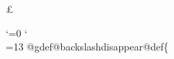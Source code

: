 {{  \lbracechar
  \leq
  \mathopsup
  \minus
  \ogonek
  \pounds
  \point
  \print
  \quotedblbase
  \quotedblleft
  \quotedblright
  \quoteleft
  \quoteright
  \quotesinglbase
  \rbracechar
  \result
  \sub
  \sup
  \textdegree
  \macrolist
  \normalturnoffactive
  \makevalueexpandable
}

%
\def\commondummiesnofonts{%
  \definedummyletter\!%
  \definedummyaccent\"%
  \definedummyaccent\'%
  \definedummyletter\*%
  \definedummyaccent\,%
  \definedummyletter\.%
  \definedummyletter\/%
  \definedummyletter\:%
  \definedummyaccent\=%
  \definedummyletter\?%
  \definedummyaccent\^%
  \definedummyaccent\`%
  \definedummyaccent\~%
  \definedummyword\u
  \definedummyword\v
  \definedummyword\H
  \definedummyword\dotaccent
  \definedummyword\ogonek
  \definedummyword\ringaccent
  \definedummyword\tieaccent
  \definedummyword\ubaraccent
  \definedummyword\udotaccent
  \definedummyword\dotless
  \definedummyword\b
  \definedummyword\i
  \definedummyword\r
  \definedummyword\sansserif
  \definedummyword\sc
  \definedummyword\slanted
  \definedummyword\t
  \definedummyword\abbr
  \definedummyword\acronym
  \definedummyword\anchor
  \definedummyword\cite
  \definedummyword\code
  \definedummyword\command
  \definedummyword\dfn
  \definedummyword\dmn
  \definedummyword\email
  \definedummyword\emph
  \definedummyword\env
  \definedummyword\file
  \definedummyword\image
  \definedummyword\indicateurl
  \definedummyword\inforef
  \definedummyword\kbd
  \definedummyword\key
  \definedummyword\math
  \definedummyword\option
  \definedummyword\pxref
  \definedummyword\ref
  \definedummyword\samp
  \definedummyword\strong
  \definedummyword\tie
  \definedummyword\U
  \definedummyword\uref
  \definedummyword\url
  \definedummyword\var
  \definedummyword\verb
  \definedummyword\w
  \definedummyword\xref
}

\newif\ifusebracesinindexes

\let\indexlbrace\relax
\let\indexrbrace\relax

{\catcode`\@=0
\catcode`\\=13
  @gdef@backslashdisappear{@def\{}}
}

